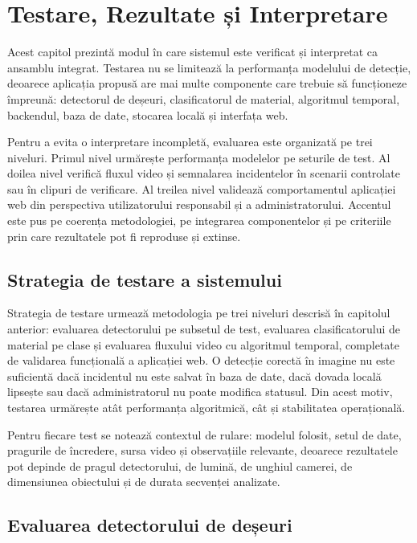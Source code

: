 \chapter{Testare, Rezultate și Interpretare}

Acest capitol prezintă modul în care sistemul este verificat și interpretat ca ansamblu integrat. Testarea nu se limitează la performanța modelului de detecție, deoarece aplicația propusă are mai multe componente care trebuie să funcționeze împreună: detectorul de deșeuri, clasificatorul de material, algoritmul temporal, backendul, baza de date, stocarea locală și interfața web.

Pentru a evita o interpretare incompletă, evaluarea este organizată pe trei niveluri. Primul nivel urmărește performanța modelelor pe seturile de test. Al doilea nivel verifică fluxul video și semnalarea incidentelor în scenarii controlate sau în clipuri de verificare. Al treilea nivel validează comportamentul aplicației web din perspectiva utilizatorului responsabil și a administratorului. Accentul este pus pe coerența metodologiei, pe integrarea componentelor și pe criteriile prin care rezultatele pot fi reproduse și extinse.

\section{Strategia de testare a sistemului}

Strategia de testare urmează metodologia pe trei niveluri descrisă în capitolul anterior: evaluarea detectorului pe subsetul de test, evaluarea clasificatorului de material pe clase și evaluarea fluxului video cu algoritmul temporal, completate de validarea funcțională a aplicației web. O detecție corectă în imagine nu este suficientă dacă incidentul nu este salvat în baza de date, dacă dovada locală lipsește sau dacă administratorul nu poate modifica statusul. Din acest motiv, testarea urmărește atât performanța algoritmică, cât și stabilitatea operațională.

Pentru fiecare test se notează contextul de rulare: modelul folosit, setul de date, pragurile de încredere, sursa video și observațiile relevante, deoarece rezultatele pot depinde de pragul detectorului, de lumină, de unghiul camerei, de dimensiunea obiectului și de durata secvenței analizate.

\section{Evaluarea detectorului de deșeuri}

